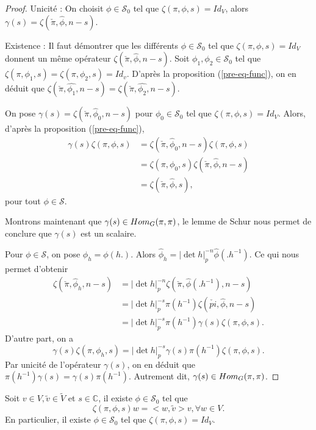 \begin{proof}
Unicité : On choisit $\phi \in \mathcal{S}_0$ tel que $\zeta(\pi,\phi,s)=Id_V$, alors $\gamma(s)=\zeta(\check{\pi}, \hat{\phi}, n-s)$.

Existence : Il faut démontrer que les différents $\phi \in \mathcal{S}_0$ tel que $\zeta(\pi,\phi,s)=Id_V$ donnent un même opérateur $\zeta(\check{\pi},\hat{\phi}, n-s)$. Soit $\phi_1,\phi_2 \in \mathcal{S}_0$ tel que $\zeta(\pi,\phi_1,s)=\zeta(\pi,\phi_2,s)=Id_v$. D'après la proposition (\ref{pre-eq-func}), on en déduit que $\zeta(\check{\pi},\hat{\phi_1}, n-s)=\zeta(\check{\pi},\hat{\phi_2}, n-s)$.

On pose $\gamma(s)=\zeta(\check{\pi},\hat{\phi}_0, n-s)$ pour $\phi_0 \in \mathcal{S}_0$ tel que $\zeta(\pi,\phi,s)=Id_V$. Alors, d'après la proposition (\ref{pre-eq-func}),
\begin{align}
\gamma(s)\zeta(\pi,\phi,s) &= \zeta(\check{\pi},\hat{\phi}_0, n-s)\zeta(\pi,\phi,s) \\
&= \zeta(\pi,\phi_0,s)\zeta(\check{\pi}, \hat{\phi}, n-s) \\
&= \zeta(\check{\pi}, \hat{\phi},s),
\end{align}
pour tout $\phi \in \mathcal{S}$.

Montrons maintenant que $\gamma(s) \in \operatorname{\mathnormal{Hom}}_G(\pi,\pi)$, le lemme de Schur nous permet de conclure que $\gamma(s)$ est un scalaire.

Pour $\phi \in \mathcal{S}$, on pose $\phi_h = \phi(h.)$. Alors $\hat{\phi}_h = |\det h|_p^{-n}\hat{\phi}(.h^{-1})$. Ce qui nous permet d'obtenir
\begin{align}
\zeta(\check{\pi}, \hat{\phi}_h, n-s)&=|\det h|_p^{-n}\zeta(\check{\pi}, \hat{\phi}(.h^{-1}),n-s) \\
&= |\det h|_p^{-s}\pi(h^{-1})\zeta(\check{pi}, \hat{\phi}, n-s) \\
&= |\det h|_p^{-s}\pi(h^{-1})\gamma(s)\zeta(\pi,\phi,s).
\end{align}
D'autre part, on a
\begin{equation}
\gamma(s)\zeta(\pi,\phi_h,s)=|\det h|_p^{-s}\gamma(s)\pi(h^{-1})\zeta(\pi,\phi,s).
\end{equation}
Par unicité de l'opérateur $\gamma(s)$, on en déduit que $\pi(h^{-1})\gamma(s)=\gamma(s)\pi(h^{-1})$. Autrement dit, $\gamma(s) \in \operatorname{\mathnormal{Hom}}_G(\pi,\pi)$.
\end{proof}

\begin{lemme}
Soit $v \in V, \tilde{v} \in \tilde{V}$ et $s \in \mathbb{C}$, il existe $\phi \in \mathcal{S}_0$ tel que
\begin{equation}
\zeta(\pi,\phi,s)w = <w,\tilde{v}>v, \forall w \in V.
\end{equation}
En particulier, il existe $\phi \in \mathcal{S}_0$ tel que $\zeta(\pi, \phi, s) = Id_V.$
\end{lemme}

